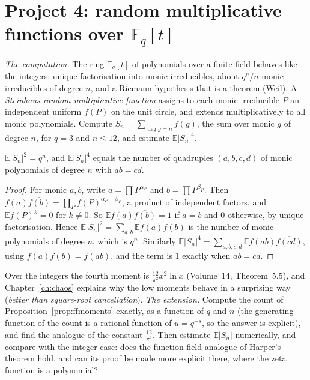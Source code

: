 \section{Project 4: random multiplicative functions over $\mathbb F_q[t]$}

\emph{The computation.} The ring $\mathbb F_q[t]$ of polynomials over a finite field behaves like the integers: unique factorisation into monic irreducibles, about $q^n/n$ monic irreducibles of degree $n$, and a Riemann hypothesis that is a theorem (Weil). A \emph{Steinhaus random multiplicative function} assigns to each monic irreducible $P$ an independent uniform $f(P)$ on the unit circle, and extends multiplicatively to all monic polynomials. Compute $S_n=\sum_{\deg g=n}f(g)$, the sum over monic $g$ of degree $n$, for $q=3$ and $n\le12$, and estimate $\mathbb E|S_n|^4$.

\begin{proposition}\label{prop:ffmoments}
$\mathbb E|S_n|^2=q^n$, and $\mathbb E|S_n|^4$ equals the number of quadruples $(a,b,c,d)$ of monic polynomials of degree $n$ with $ab=cd$.
\end{proposition}

\begin{proof}
For monic $a,b$, write $a=\prod P^{\alpha_P}$ and $b=\prod P^{\beta_P}$. Then $f(a)\overline{f(b)}=\prod_Pf(P)^{\alpha_P-\beta_P}$, a product of independent factors, and $\mathbb E f(P)^k=0$ for $k\ne0$. So $\mathbb E f(a)\overline{f(b)}=1$ if $a=b$ and $0$ otherwise, by unique factorisation. Hence $\mathbb E|S_n|^2=\sum_{a,b}\mathbb E f(a)\overline{f(b)}$ is the number of monic polynomials of degree $n$, which is $q^n$. Similarly $\mathbb E|S_n|^4=\sum_{a,b,c,d}\mathbb E f(ab)\overline{f(cd)}$, using $f(a)f(b)=f(ab)$, and the term is $1$ exactly when $ab=cd$.
\end{proof}

Over the integers the fourth moment is $\frac{12}{\pi^2}x^2\ln x$ (Volume~14, Theorem~5.5), and Chapter~\ref{ch:chaos} explains why the low moments behave in a surprising way (\emph{better than square-root cancellation}). \emph{The extension.} Compute the count of Proposition~\ref{prop:ffmoments} exactly, as a function of $q$ and $n$ (the generating function of the count is a rational function of $u=q^{-s}$, so the answer is explicit), and find the analogue of the constant $\frac{12}{\pi^2}$. Then estimate $\mathbb E|S_n|$ numerically, and compare with the integer case: does the function field analogue of Harper's theorem hold, and can its proof be made more explicit there, where the zeta function is a polynomial?

